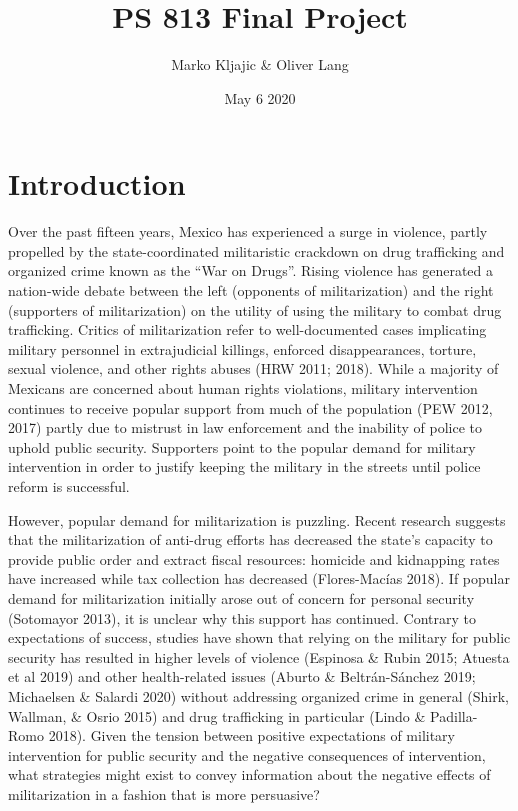\documentclass[
  12pt,
]{article}
\title{\textbf{PS 813 Final Project}}
\author{Marko Kljajic \& Oliver Lang}
\date{May 6 2020}
\begin{document}
\maketitle

\hypertarget{introduction}{%
\section{Introduction}\label{introduction}}

Over the past fifteen years, Mexico has experienced a surge in violence,
partly propelled by the state-coordinated militaristic crackdown on drug
trafficking and organized crime known as the ``War on Drugs''. Rising
violence has generated a nation-wide debate between the left (opponents
of militarization) and the right (supporters of militarization) on the
utility of using the military to combat drug trafficking. Critics of
militarization refer to well-documented cases implicating military
personnel in extrajudicial killings, enforced disappearances, torture,
sexual violence, and other rights abuses (HRW 2011; 2018). While a
majority of Mexicans are concerned about human rights violations,
military intervention continues to receive popular support from much of
the population (PEW 2012, 2017) partly due to mistrust in law
enforcement and the inability of police to uphold public security.
Supporters point to the popular demand for military intervention in
order to justify keeping the military in the streets until police reform
is successful.

However, popular demand for militarization is puzzling. Recent research
suggests that the militarization of anti-drug efforts has decreased the
state's capacity to provide public order and extract fiscal resources:
homicide and kidnapping rates have increased while tax collection has
decreased (Flores-Macías 2018). If popular demand for militarization
initially arose out of concern for personal security (Sotomayor 2013),
it is unclear why this support has continued. Contrary to expectations
of success, studies have shown that relying on the military for public
security has resulted in higher levels of violence (Espinosa \& Rubin
2015; Atuesta et al 2019) and other health-related issues (Aburto \&
Beltrán-Sánchez 2019; Michaelsen \& Salardi 2020) without addressing
organized crime in general (Shirk, Wallman, \& Osrio 2015) and drug
trafficking in particular (Lindo \& Padilla-Romo 2018). Given the
tension between positive expectations of military intervention for
public security and the negative consequences of intervention, what
strategies might exist to convey information about the negative effects
of militarization in a fashion that is more persuasive?
\end{document}
